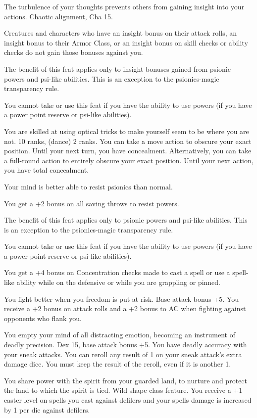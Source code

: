 {The turbulence of your thoughts prevents others from gaining insight into your actions.}
{Chaotic alignment, Cha 15.}
{Creatures and characters who have an insight bonus on their attack rolls, an insight bonus to their Armor Class, or an insight bonus on skill checks or ability checks do not gain those bonuses against you.

The benefit of this feat applies only to insight bonuses gained from psionic powers and psi-like abilities. This is an exception to the psionics-magic transparency rule.}{}
{You cannot take or use this feat if you have the ability to use powers (if you have a power point reserve or psi-like abilities).}

{You are skilled at using optical tricks to make yourself seem to be where you are not.}
{ 10 ranks,  (dance) 2 ranks.}
{You can take a move action to obscure your exact position. Until your next turn, you have concealment. Alternatively, you can take a full-round action to entirely obscure your exact position. Until your next action, you have total concealment.}{}{}

{Your mind is better able to resist psionics than normal.}{}
{You get a +2 bonus on all saving throws to resist powers.

The benefit of this feat applies only to psionic powers and psi-like abilities. This is an exception to the psionics-magic transparency rule.}{}
{You cannot take or use this feat if you have the ability to use powers (if you have a power point reserve or psi-like abilities).}

{You get a +4 bonus on Concentration checks made to cast a spell or use a spell-like ability while on the defensive or while you are grappling or pinned.}

{You fight better when you freedom is put at risk.}
{Base attack bonus +5.}
{You receive a +2 bonus on attack rolls and a +2 bonus to AC when fighting against opponents who flank you.}
{}{}

{You empty your mind of all distracting emotion, becoming an instrument of deadly precision.}
{Dex 15, base attack bonus +5.}
{You have deadly accuracy with your sneak attacks. You can reroll any result of 1 on your sneak attack's extra damage dice. You must keep the result of the reroll, even if it is another 1.}{}{}

{You share power with the spirit from your guarded land, to nurture and protect the land to which the spirit is tied.}
{Wild shape class feature.}
{You receive a +1 caster level on spells you cast against defilers and your spells damage is increased by 1 per die against defilers.}
{}{}

